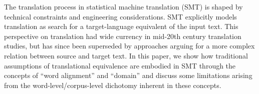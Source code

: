The translation process in statistical machine translation (SMT) is shaped by technical constraints and engineering considerations. SMT explicitly models translation as search for a target-language equivalent of the input text. This perspective on translation had wide currency in mid-20th century translation studies, but has since been superseded by approaches arguing for a more complex relation between source and target text. In this paper, we show how traditional assumptions of translational equivalence are embodied in SMT through the concepts of ``word alignment'' and ``domain'' and discuss some limitations arising from the word-level/corpus-level dichotomy inherent in these concepts.
